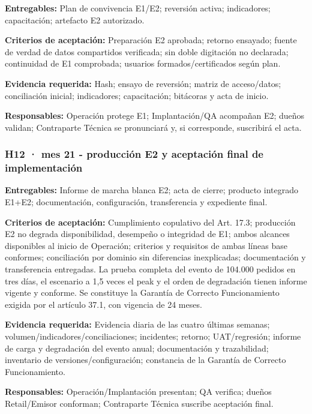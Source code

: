 \documentclass[11pt]{article}
\begin{document}
\textbf{Entregables:} Plan de convivencia E1/E2; reversión activa; indicadores; capacitación; artefacto E2 autorizado.

\textbf{Criterios de aceptación:} Preparación E2 aprobada; retorno ensayado; fuente de verdad de datos compartidos verificada; sin doble digitación no declarada; continuidad de E1 comprobada; usuarios formados/certificados según plan.

\textbf{Evidencia requerida:} Hash; ensayo de reversión; matriz de acceso/datos; conciliación inicial; indicadores; capacitación; bitácoras y acta de inicio.

\textbf{Responsables:} Operación protege E1; Implantación/QA acompañan E2; dueños validan; Contraparte Técnica se pronunciará y, si corresponde, suscribirá el acta.

\subsubsection{\texorpdfstring{\textbf{H12 · mes 21} - producción E2 y aceptación final de implementación}{H12 · mes 21 - producción E2 y aceptación final de implementación}}\label{t17-h12-mes-21-producciuxf3n-e2-y-aceptaciuxf3n-final-de-implementaciuxf3n}

\textbf{Entregables:} Informe de marcha blanca E2; acta de cierre; producto integrado E1+E2; documentación, configuración, transferencia y expediente final.

\textbf{Criterios de aceptación:} Cumplimiento copulativo del Art. 17.3; producción E2 no degrada disponibilidad, desempeño o integridad de E1; ambos alcances disponibles al inicio de Operación; criterios y requisitos de ambas líneas base conformes; conciliación por dominio sin diferencias inexplicadas; documentación y transferencia entregadas. La prueba completa del evento de 104.000 pedidos en tres días, el escenario a 1,5 veces el peak y el orden de degradación tienen informe vigente y conforme. Se constituye la Garantía de Correcto Funcionamiento exigida por el artículo 37.1, con vigencia de 24 meses.

\textbf{Evidencia requerida:} Evidencia diaria de las cuatro últimas semanas; volumen/indicadores/conciliaciones; incidentes; retorno; UAT/regresión; informe de carga y degradación del evento anual; documentación y trazabilidad; inventario de versiones/configuración; constancia de la Garantía de Correcto Funcionamiento.

\textbf{Responsables:} Operación/Implantación presentan; QA verifica; dueños Retail/Emisor conforman; Contraparte Técnica suscribe aceptación final.
\end{document}
